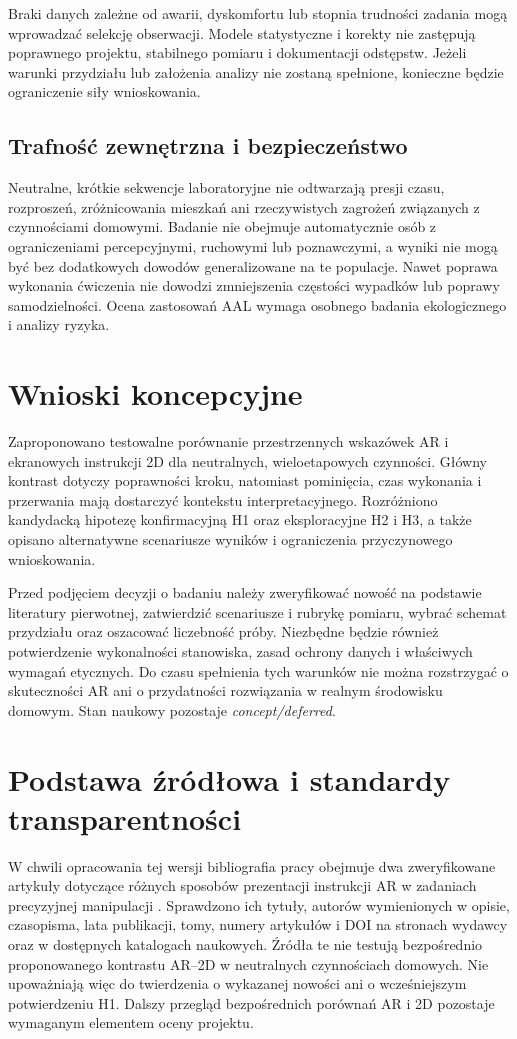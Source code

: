 \documentclass[11pt,a4paper]{article}
\begin{document}
Braki danych zależne od awarii, dyskomfortu lub stopnia trudności zadania mogą wprowadzać selekcję obserwacji. Modele statystyczne i korekty nie zastępują poprawnego projektu, stabilnego pomiaru i dokumentacji odstępstw. Jeżeli warunki przydziału lub założenia analizy nie zostaną spełnione, konieczne będzie ograniczenie siły wnioskowania.

\subsection{Trafność zewnętrzna i bezpieczeństwo}
Neutralne, krótkie sekwencje laboratoryjne nie odtwarzają presji czasu, rozproszeń, zróżnicowania mieszkań ani rzeczywistych zagrożeń związanych z czynnościami domowymi. Badanie nie obejmuje automatycznie osób z ograniczeniami percepcyjnymi, ruchowymi lub poznawczymi, a wyniki nie mogą być bez dodatkowych dowodów generalizowane na te populacje. Nawet poprawa wykonania ćwiczenia nie dowodzi zmniejszenia częstości wypadków lub poprawy samodzielności. Ocena zastosowań AAL wymaga osobnego badania ekologicznego i analizy ryzyka.

\section{Wnioski koncepcyjne}
Zaproponowano testowalne porównanie przestrzennych wskazówek AR i ekranowych instrukcji 2D dla neutralnych, wieloetapowych czynności. Główny kontrast dotyczy poprawności kroku, natomiast pominięcia, czas wykonania i przerwania mają dostarczyć kontekstu interpretacyjnego. Rozróżniono kandydacką hipotezę konfirmacyjną H1 oraz eksploracyjne H2 i H3, a także opisano alternatywne scenariusze wyników i ograniczenia przyczynowego wnioskowania.

Przed podjęciem decyzji o badaniu należy zweryfikować nowość na podstawie literatury pierwotnej, zatwierdzić scenariusze i rubrykę pomiaru, wybrać schemat przydziału oraz oszacować liczebność próby. Niezbędne będzie również potwierdzenie wykonalności stanowiska, zasad ochrony danych i właściwych wymagań etycznych. Do czasu spełnienia tych warunków nie można rozstrzygać o skuteczności AR ani o przydatności rozwiązania w realnym środowisku domowym. Stan naukowy pozostaje \textit{concept/deferred}.

\section{Podstawa źródłowa i standardy transparentności}
W chwili opracowania tej wersji bibliografia pracy obejmuje dwa zweryfikowane artykuły dotyczące różnych sposobów prezentacji instrukcji AR w zadaniach precyzyjnej manipulacji \cite{xrprior1,xrprior2}. Sprawdzono ich tytuły, autorów wymienionych w opisie, czasopisma, lata publikacji, tomy, numery artykułów i DOI na stronach wydawcy oraz w dostępnych katalogach naukowych. Źródła te nie testują bezpośrednio proponowanego kontrastu AR--2D w neutralnych czynnościach domowych. Nie upoważniają więc do twierdzenia o wykazanej nowości ani o wcześniejszym potwierdzeniu H1. Dalszy przegląd bezpośrednich porównań AR i 2D pozostaje wymaganym elementem oceny projektu.
\end{document}
